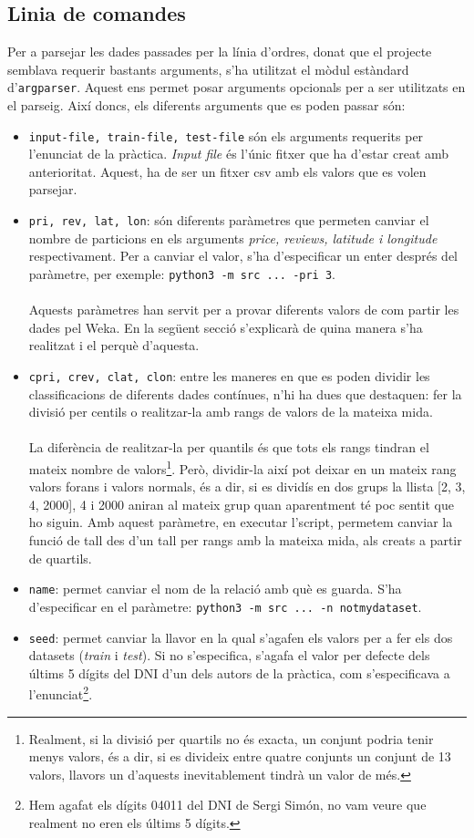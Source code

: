 \subsection{Linia de comandes}
Per a parsejar les dades passades per la línia d'ordres, donat que el projecte semblava
requerir bastants arguments, s'ha utilitzat el mòdul estàndard d'\texttt{argparser}. Aquest
ens permet posar arguments opcionals per a ser utilitzats en el parseig. Així doncs, els
diferents arguments que es poden passar són:
\begin{itemize}
	\item \texttt{input-file, train-file, test-file} són els arguments requerits per l'enunciat de la pràctica.
		\textit{Input file} és l'únic fitxer que ha d'estar creat amb anterioritat. Aquest, ha de ser un fitxer
		csv amb els valors que es volen parsejar. 
	\item \texttt{pri, rev, lat, lon}: són diferents paràmetres que permeten canviar el nombre de particions en els arguments \textit{price, reviews, latitude i longitude} respectivament. Per a
	canviar el valor, s'ha d'especificar un enter després del paràmetre, per exemple:
	\verb|python3 -m src ... -pri 3|.\\
	\\
	Aquests paràmetres han servit per a provar diferents valors de com partir les dades pel Weka.
	En la següent secció s'explicarà de quina manera s'ha realitzat i el perquè d'aquesta.
	\item \texttt{cpri, crev, clat, clon}: entre les maneres en que es poden dividir les classificacions de
	diferents dades contínues, n'hi ha dues que destaquen: fer la divisió per centils o realitzar-la
	amb rangs de valors de la mateixa mida.\\
	\\
	La diferència de realitzar-la per quantils és que tots
	els rangs tindran el mateix nombre de valors\footnote{Realment, si la divisió per quartils no
	és exacta, un conjunt podria tenir menys valors, és a dir, si es divideix entre quatre conjunts un
	conjunt de 13 valors, llavors un d'aquests inevitablement tindrà un valor de més.}. Però, dividir-la
	així pot deixar en un mateix rang valors forans i valors normals, és a dir, si es dividís en dos
	grups la llista [2, 3, 4, 2000], 4 i 2000 aniran al mateix grup quan aparentment té poc sentit
	que ho siguin. Amb aquest paràmetre, en executar l'script, permetem canviar la funció de tall 
	des d'un tall per rangs amb la mateixa mida, als creats a partir de quartils.
	\item \texttt{name}: permet canviar el nom de la relació amb què es guarda. S'ha d'especificar
	en el paràmetre: \verb|python3 -m src ... -n notmydataset|.
	\item \texttt{seed}: permet canviar la llavor en la qual s'agafen els valors per a fer els dos
	datasets (\textit{train} i \textit{test}). Si no s'especifica, s'agafa el valor per defecte 
	dels últims 5 dígits del DNI d'un dels autors de la pràctica, com s'especificava a l'enunciat\footnote{Hem agafat els dígits 04011 del DNI de Sergi Simón, no vam veure que realment no eren els últims 5 dígits.}.
\end{itemize}
